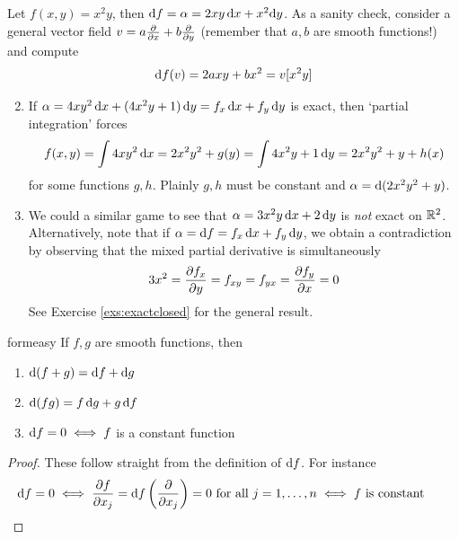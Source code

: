 \begin{examples}{}{}
	\exstart Let $f(x,y)=x^2y$, then $\df=\alpha=2xy\,\dx+x^2\dy$. As a sanity check, consider a general vector field $v=a\partials x+b\partials y$ (remember that $a,b$ are smooth functions!) and compute 
	\[
		\df(v)=2axy+bx^2=v[x^2y]
	\]
	\begin{enumerate}\setcounter{enumi}{1}
	  \item If $\alpha=4xy^2\,\dx+(4x^2y+1)\,\dy=f_x\,\dx+f_y\,\dy$ is exact, then `partial integration' forces
	  \[
	  	f(x,y)=\int 4xy^2\,\dx=2x^2y^2+g(y) =\int 4x^2y+1\,\dy=2x^2y^2+y+h(x)
	  \]
	  for some functions $g,h$. Plainly $g,h$ must be constant and $\alpha=\D(2x^2y^2+y)$.
	  
	  \item We could a similar game to see that $\alpha=3x^2y\,\dx+2\,\dy$ is \emph{not} exact on $\R^2$. Alternatively, note that if $\alpha=\df=f_x\,\dx+f_y\,\dy$, we obtain a contradiction by observing that the mixed partial derivative is simultaneously
	  \[
	  	3x^2=\partials[f_x]{y}=f_{xy}=f_{yx}=\partials[f_y]{x}=0
	  \]
	  See Exercise \ref{exs:exactclosed} for the general result.
	\end{enumerate}
\end{examples}


\begin{lemm}{}{formeasy}
	If $f,g$ are smooth functions, then
	\begin{enumerate}%
		\item $\D(f+g)=\df+\dg$
		\item $\D(fg)=f\,\dg+g\,\df$
		\item $\df=0\iff f$ is a constant function
	\end{enumerate}
\end{lemm}

\begin{proof}
	These follow straight from the definition of $\df$. For instance
	\[
		\df=0\iff \partials[f]{x_j}=\df\left(\partials{x_j}\right)=0\text{ for all }j=1,\ldots,n \iff f\text{ is constant} \tag*{\qedhere}
	\]
\end{proof}

